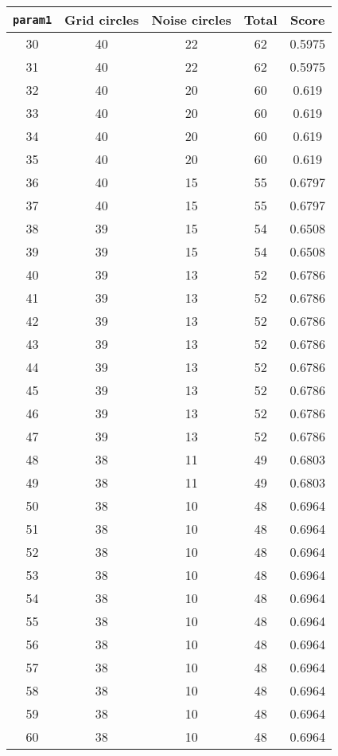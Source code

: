 \documentclass[letterpaper, 12pt]{article}
\begin{document}
\begin{longtable}{|c|c|c|c|c|}
\hline
\textbf{\texttt{param1}} & \textbf{Grid circles} & \textbf{Noise circles} & \textbf{Total} & \textbf{Score} \\
\hline
30 & 40 & 22 & 62 & 0.5975 \\
\hline
31 & 40 & 22 & 62 & 0.5975 \\
\hline
32 & 40 & 20 & 60 & 0.619 \\
\hline
33 & 40 & 20 & 60 & 0.619 \\
\hline
34 & 40 & 20 & 60 & 0.619 \\
\hline
35 & 40 & 20 & 60 & 0.619 \\
\hline
36 & 40 & 15 & 55 & 0.6797 \\
\hline
37 & 40 & 15 & 55 & 0.6797 \\
\hline
38 & 39 & 15 & 54 & 0.6508 \\
\hline
39 & 39 & 15 & 54 & 0.6508 \\
\hline
40 & 39 & 13 & 52 & 0.6786 \\
\hline
41 & 39 & 13 & 52 & 0.6786 \\
\hline
42 & 39 & 13 & 52 & 0.6786 \\
\hline
43 & 39 & 13 & 52 & 0.6786 \\
\hline
44 & 39 & 13 & 52 & 0.6786 \\
\hline
45 & 39 & 13 & 52 & 0.6786 \\
\hline
46 & 39 & 13 & 52 & 0.6786 \\
\hline
47 & 39 & 13 & 52 & 0.6786 \\
\hline
48 & 38 & 11 & 49 & 0.6803 \\
\hline
49 & 38 & 11 & 49 & 0.6803 \\
\hline
50 & 38 & 10 & 48 & 0.6964 \\
\hline
51 & 38 & 10 & 48 & 0.6964 \\
\hline
52 & 38 & 10 & 48 & 0.6964 \\
\hline
53 & 38 & 10 & 48 & 0.6964 \\
\hline
54 & 38 & 10 & 48 & 0.6964 \\
\hline
55 & 38 & 10 & 48 & 0.6964 \\
\hline
56 & 38 & 10 & 48 & 0.6964 \\
\hline
57 & 38 & 10 & 48 & 0.6964 \\
\hline
58 & 38 & 10 & 48 & 0.6964 \\
\hline
59 & 38 & 10 & 48 & 0.6964 \\
\hline
60 & 38 & 10 & 48 & 0.6964 \\

\end{longtable}
\end{document}
